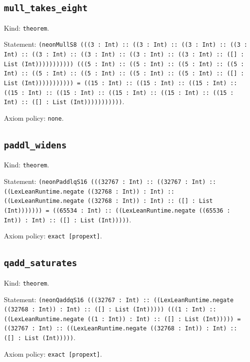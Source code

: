 \documentclass[11pt]{article}
\begin{document}
\subsection*{\texttt{mull\_takes\_eight}}
\noindent Kind: \texttt{theorem}.\par
\noindent Statement: \texttt{(neonMullS8 (((3 : Int) :: ((3 : Int) :: ((3 : Int) :: ((3 : Int) :: ((3 : Int) :: ((3 : Int) :: ((3 : Int) :: ((3 : Int) :: ([] : List (Int))))))))))) (((5 : Int) :: ((5 : Int) :: ((5 : Int) :: ((5 : Int) :: ((5 : Int) :: ((5 : Int) :: ((5 : Int) :: ((5 : Int) :: ([] : List (Int))))))))))) = ((15 : Int) :: ((15 : Int) :: ((15 : Int) :: ((15 : Int) :: ((15 : Int) :: ((15 : Int) :: ((15 : Int) :: ((15 : Int) :: ([] : List (Int)))))))))))}.\par
\noindent Axiom policy: \texttt{none}.\par
\subsection*{\texttt{paddl\_widens}}
\noindent Kind: \texttt{theorem}.\par
\noindent Statement: \texttt{(neonPaddlqS16 (((32767 : Int) :: ((32767 : Int) :: ((LexLeanRuntime.negate ((32768 : Int)) : Int) :: ((LexLeanRuntime.negate ((32768 : Int)) : Int) :: ([] : List (Int))))))) = ((65534 : Int) :: ((LexLeanRuntime.negate ((65536 : Int)) : Int) :: ([] : List (Int)))))}.\par
\noindent Axiom policy: \texttt{exact [propext]}.\par
\subsection*{\texttt{qadd\_saturates}}
\noindent Kind: \texttt{theorem}.\par
\noindent Statement: \texttt{(neonQaddqS16 (((32767 : Int) :: ((LexLeanRuntime.negate ((32768 : Int)) : Int) :: ([] : List (Int))))) (((1 : Int) :: ((LexLeanRuntime.negate ((1 : Int)) : Int) :: ([] : List (Int))))) = ((32767 : Int) :: ((LexLeanRuntime.negate ((32768 : Int)) : Int) :: ([] : List (Int)))))}.\par
\noindent Axiom policy: \texttt{exact [propext]}.\par
\end{document}
